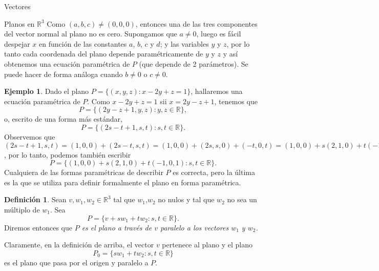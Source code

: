 \documentclass[a4paper,12pt,twoside,spanish,reqno]{amsbook}
\theoremstyle{definition}
\newtheorem{definicion}{Definici\'on}[section]
\newtheorem{ejemplo}{Ejemplo}[section]
\theoremstyle{remark}
\newcommand{\R}{\mathbb R}
\begin{document}
\begin{chapter}{Vectores}
\begin{section}{Planos en $\R^3$}
        Como $(a,b,c) \ne (0,0,0)$,  entonces una de las tres componentes del vector normal al plano no es cero. Supongamos que $a\ne 0$,  luego es fácil despejar $x$ en función de las constantes $a$, $b$, $c$ y $d$; y las variables $y$ y $z$, por lo tanto cada coordenada del plano depende paramétricamente de $y$ y $z$ y así obtenemos una ecuación paramétrica de $P$ (que depende de 2 parámetros). Se puede hacer de forma análoga cuando $b\ne 0$ o $c \ne 0$. 
        
        \begin{ejemplo}
            Dado el plano $P = \{(x,y,z): x -2y +z =1\}$,  hallaremos una ecuación paramétrica de $P$. Como  $x -2y +z =1$ sii  $x = 2y-z +1$, tenemos que
            \begin{equation*}
                P = \{(2y-z +1,y,z): y,z \in \R\},
            \end{equation*}
            o,  escrito de una forma más estándar,
            \begin{equation*}
            P = \{(2s-t +1,s,t): s,t \in \R\}. 
            \end{equation*}
            Observemos que $(2s-t +1,s,t) = (1,0,0) + (2s-t,s,t)= (1,0,0) + (2s,s,0) + (-t,0,t) = (1,0,0) + s(2,1,0) + t(-1,0,1) $, por lo tanto, podemos también escribir
            \begin{equation*}
            P = \{(1,0,0) + s(2,1,0) + t(-1,0,1): s,t \in \R\}. 
            \end{equation*}
            Cualquiera de las formas paramétricas de describir $P$  es correcta, pero la última es la que se utiliza para definir formalmente el plano en forma paramétrica. 
            
        \end{ejemplo}
    
    \begin{definicion}
        Sean $v, w_1,w_2 \in \R^3$ tal que  $w_1$,$w_2$ no  nulos y tal que $w_2$ no sea un múltiplo de $w_1$. Sea 
        \begin{equation*}
        P = \{v + sw_1 + tw_2: s,t \in \R\}. 
        \end{equation*}
        Diremos entonces que  \textit{$P$ es el  plano a través de $v$ paralelo a los vectores $w_1$ y $w_2$.}\index{plano en $\R^3$!ecuación paramétrica} 
    \end{definicion}
    
        Claramente,  en la definición de arriba, el vector $v$ pertenece al plano y el plano 
        \begin{equation*}
        P_0 = \{sw_1 + tw_2: s,t \in \R\}
        \end{equation*}
        es el plano que pasa por el origen y paralelo a $P$. 
    \end{section}
    

\end{chapter}
\end{document}
